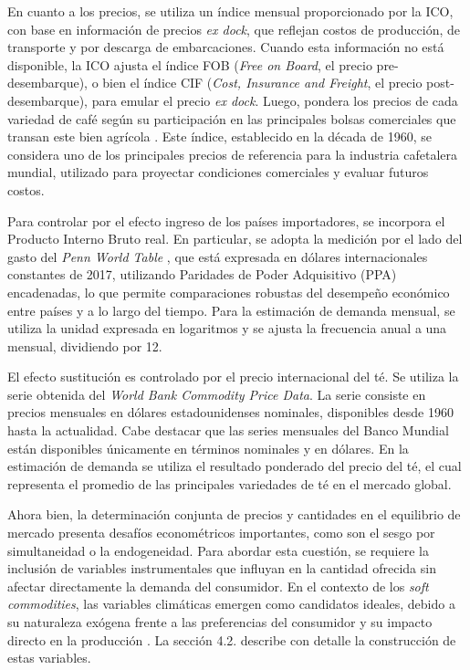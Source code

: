 En cuanto a los precios, se utiliza un índice mensual proporcionado por la ICO, con base en información de precios \textit{ex dock}, que reflejan costos de producción, de transporte y por descarga de embarcaciones. Cuando esta información no está disponible, la ICO ajusta el índice FOB (\textit{Free on Board}, el precio pre-desembarque), o bien el índice CIF (\textit{Cost, Insurance and Freight}, el precio post-desembarque), para emular el precio \textit{ex dock}. Luego, pondera los precios de cada variedad de café según su participación en las principales bolsas comerciales que transan este bien agrícola \citep{ICIP2024}. Este índice, establecido en la década de 1960, se considera uno de los principales precios de referencia para la industria cafetalera mundial, utilizado para proyectar condiciones comerciales y evaluar futuros costos.

Para controlar por el efecto ingreso de los países importadores, se incorpora el Producto Interno Bruto real. En particular, se adopta la medición por el lado del gasto del \textit{Penn World Table} \citep{Feenstra2015}, que está expresada en dólares internacionales constantes de 2017, utilizando Paridades de Poder Adquisitivo (PPA) encadenadas, lo que permite comparaciones robustas del desempeño económico entre países y a lo largo del tiempo. Para la estimación de demanda mensual, se utiliza la unidad expresada en logaritmos y se ajusta la frecuencia anual a una mensual, dividiendo por 12.

El efecto sustitución es controlado por el precio internacional del té. Se utiliza la serie obtenida del \textit{World Bank Commodity Price Data}. La serie consiste en precios mensuales en dólares estadounidenses nominales, disponibles desde 1960 hasta la actualidad. Cabe destacar que las series mensuales del Banco Mundial están disponibles únicamente en términos nominales y en dólares. En la estimación de demanda se utiliza el resultado ponderado del precio del té, el cual representa el promedio de las principales variedades de té en el mercado global.

Ahora bien, la determinación conjunta de precios y cantidades en el equilibrio de mercado presenta desafíos econométricos importantes, como son el sesgo por simultaneidad o la endogeneidad. Para abordar esta cuestión, se requiere la inclusión de variables instrumentales que influyan en la cantidad ofrecida sin afectar directamente la demanda del consumidor. En el contexto de los \textit{soft commodities}, las variables climáticas emergen como candidatos ideales, debido a su naturaleza exógena frente a las preferencias del consumidor y su impacto directo en la producción \citep{roberts2013, igami2015market}. La sección 4.2. describe con detalle la construcción de estas variables.

